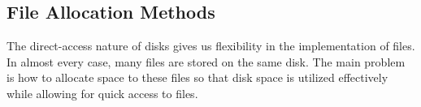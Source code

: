 \subsection{File Allocation Methods}\label{subsec:File_Allocation_Methods}
The direct-access nature of disks gives us flexibility in the implementation of files.
In almost every case, many files are stored on the same disk.
The main problem is how to allocate space to these files so that disk space is utilized effectively while allowing for quick access to files.


